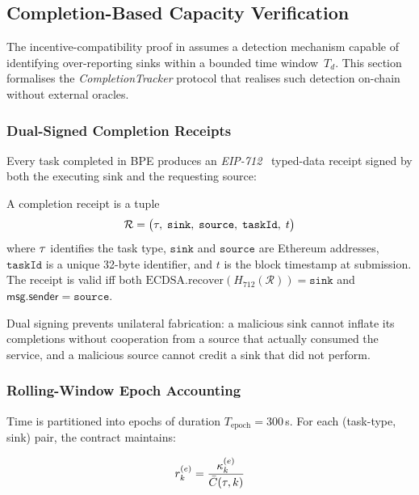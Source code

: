 \subsection{Completion-Based Capacity Verification}
\label{sec:verification}

The incentive-compatibility proof in  assumes a detection mechanism
capable of identifying over-reporting sinks within a bounded time window~$T_d$.
This section formalises the \emph{CompletionTracker} protocol that realises such
detection on-chain without external oracles.

\subsubsection{Dual-Signed Completion Receipts}

Every task completed in BPE produces an \emph{EIP-712}~\cite{eip712} typed-data
receipt signed by both the executing sink and the requesting source:

\begin{definition}[CompletionReceipt]
\label{def:completion-receipt}
A completion receipt is a tuple
\[
  \mathcal{R} = \bigl(\tau,\; \texttt{sink},\; \texttt{source},\;
                       \texttt{taskId},\; t\bigr)
\]
where $\tau$ identifies the task type, $\texttt{sink}$ and
$\texttt{source}$ are Ethereum addresses, $\texttt{taskId}$ is a unique
32-byte identifier, and $t$ is the block timestamp at submission.
The receipt is valid iff both
$\mathrm{ECDSA.recover}(H_{712}(\mathcal{R})) = \texttt{sink}$ and
$\mathsf{msg.sender} = \texttt{source}$.
\end{definition}

Dual signing prevents unilateral fabrication: a malicious sink cannot
inflate its completions without cooperation from a source that actually
consumed the service, and a malicious source cannot credit a sink that
did not perform.

\subsubsection{Rolling-Window Epoch Accounting}

Time is partitioned into epochs of duration $T_{\mathrm{epoch}} = 300$\,s.
For each (task-type, sink) pair, the contract maintains:

\begin{equation}
\label{eq:completion-rate}
r_k^{(e)} = \frac{\kappa_k^{(e)}}{\bar{C}(\tau, k)}
\end{equation}

